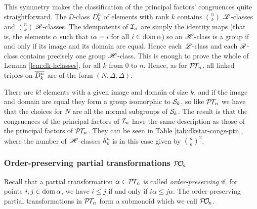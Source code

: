 This symmetry makes the classification of the principal factors' congruences
quite straightforward.  The $\DD$-class $D_k^n$ of elements with rank $k$
contains $\binom{n}{k}$ $\mathrel{\mathscr{L}}$-classes and $\binom{n}{k}$ $\mathrel{\mathscr{R}}$-classes.  The
idempotents of $\mathcal{I}_n$ are simply the identity maps (that is, the elements
$\alpha$ such that $i\alpha = i$ for all $i \in \operatorname{dom}\alpha$) so an $\mathrel{\mathscr{H}}$-class
is a group if and only if its image and its domain are equal.  Hence each
$\mathrel{\mathscr{L}}$-class and each $\mathrel{\mathscr{R}}$-class contains precisely one group $\mathrel{\mathscr{H}}$-class.  This
is enough to prove the whole of Lemma \ref{lem:dk-hclasses}, for all $k$ from
$0$ to $n$.  Hence, as for $\mathcal{P\!T\!}_n$, all linked triples on $\overline{D_k^n}$ are of
the form $(N, \Delta, \Delta)$.

There are $k!$ elements with a given image and domain of size $k$, and if the
image and domain are equal they form a group isomorphic to $\mathcal{S}_k$, so like
$\mathcal{P\!T\!}_n$ we have that the choices for $N$ are all the normal subgroups of
$\mathcal{S}_k$.  The result is that the congruences of the principal factors of $\mathcal{I}_n$
have the same description as those of the principal factors of $\mathcal{P\!T\!}_n$.  They
can be seen in Table \ref{tab:dkstar-congs-ptn}, where the number of
$\mathrel{\mathscr{H}}$-classes $h_k^n$ is in this case given by $\binom{n}{k}^2$.

\subsubsection{Order-preserving partial transformations $\mathcal{P\!O\!}_n$}
\label{sec:princfact-pon}
Recall that a partial transformation $\alpha \in \mathcal{P\!T\!}_n$ is called
\textit{order-preserving} if, for points $i,j \in \operatorname{dom}\alpha$, we have
$i \leq j$ if and only if $i\alpha \leq j\alpha$.  The order-preserving partial
transformations in $\mathcal{P\!T\!}_n$ form a submonoid which we call $\mathcal{P\!O\!}_n$.

